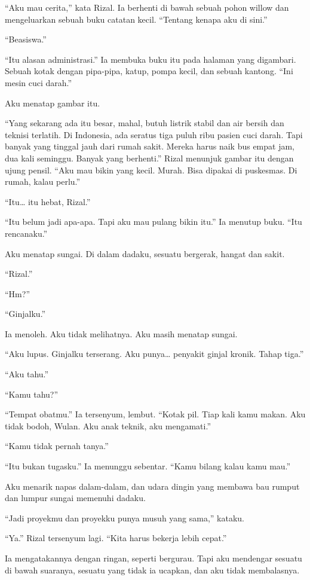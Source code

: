 \documentclass[11pt,twoside,openany]{book}
\begin{document}
``Aku mau cerita,'' kata Rizal. Ia berhenti di bawah sebuah pohon willow dan mengeluarkan sebuah buku catatan kecil. ``Tentang kenapa aku di sini.''

``Beasiswa.''

``Itu alasan administrasi.'' Ia membuka buku itu pada halaman yang digambari. Sebuah kotak dengan pipa-pipa, katup, pompa kecil, dan sebuah kantong. ``Ini mesin cuci darah.''

Aku menatap gambar itu.

``Yang sekarang ada itu besar, mahal, butuh listrik stabil dan air bersih dan teknisi terlatih. Di Indonesia, ada seratus tiga puluh ribu pasien cuci darah. Tapi banyak yang tinggal jauh dari rumah sakit. Mereka harus naik bus empat jam, dua kali seminggu. Banyak yang berhenti.'' Rizal menunjuk gambar itu dengan ujung pensil. ``Aku mau bikin yang kecil. Murah. Bisa dipakai di puskesmas. Di rumah, kalau perlu.''

``Itu\ldots{} itu hebat, Rizal.''

``Itu belum jadi apa-apa. Tapi aku mau pulang bikin itu.'' Ia menutup buku. ``Itu rencanaku.''

Aku menatap sungai. Di dalam dadaku, sesuatu bergerak, hangat dan sakit.

``Rizal.''

``Hm?''

``Ginjalku.''

Ia menoleh. Aku tidak melihatnya. Aku masih menatap sungai.

``Aku lupus. Ginjalku terserang. Aku punya\ldots{} penyakit ginjal kronik. Tahap tiga.''

``Aku tahu.''

``Kamu tahu?''

``Tempat obatmu.'' Ia tersenyum, lembut. ``Kotak pil. Tiap kali kamu makan. Aku tidak bodoh, Wulan. Aku anak teknik, aku mengamati.''

``Kamu tidak pernah tanya.''

``Itu bukan tugasku.'' Ia menunggu sebentar. ``Kamu bilang kalau kamu mau.''

Aku menarik napas dalam-dalam, dan udara dingin yang membawa bau rumput dan lumpur sungai memenuhi dadaku.

``Jadi proyekmu dan proyekku punya musuh yang sama,'' kataku.

``Ya.'' Rizal tersenyum lagi. ``Kita harus bekerja lebih cepat.''

Ia mengatakannya dengan ringan, seperti bergurau. Tapi aku mendengar sesuatu di bawah suaranya, sesuatu yang tidak ia ucapkan, dan aku tidak membalasnya.
\end{document}

